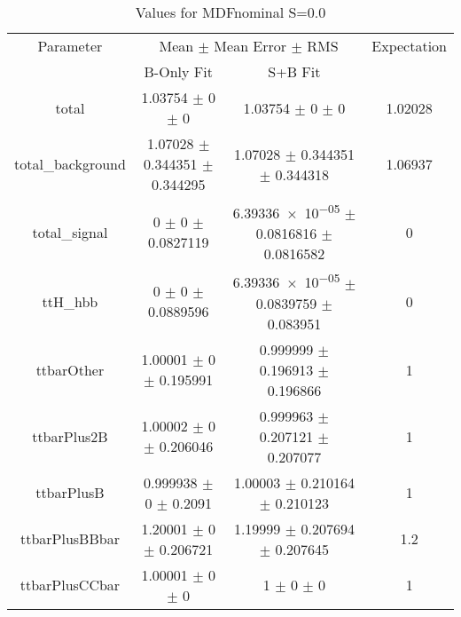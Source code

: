 \begin{table}
\centering
\caption{Values for MDFnominal S=0.0}
\begin{tabular}{cccc}
\toprule
Parameter & \multicolumn{2}{c}{Mean $\pm$ Mean Error $\pm$ RMS} & Expectation\\
 & B-Only Fit & S+B Fit & \\
\midrule
total & \num{1.03754} $\pm$ \num{0} $\pm$ \num{0} & \num{1.03754} $\pm$ \num{0} $\pm$ \num{0} & \num{1.02028}\\
total\_background & \num{1.07028} $\pm$ \num{0.344351} $\pm$ \num{0.344295} & \num{1.07028} $\pm$ \num{0.344351} $\pm$ \num{0.344318} & \num{1.06937}\\
total\_signal & \num{0} $\pm$ \num{0} $\pm$ \num{0.0827119} & \num{6.39336e-05} $\pm$ \num{0.0816816} $\pm$ \num{0.0816582} & \num{0}\\
ttH\_hbb & \num{0} $\pm$ \num{0} $\pm$ \num{0.0889596} & \num{6.39336e-05} $\pm$ \num{0.0839759} $\pm$ \num{0.083951} & \num{0}\\
ttbarOther & \num{1.00001} $\pm$ \num{0} $\pm$ \num{0.195991} & \num{0.999999} $\pm$ \num{0.196913} $\pm$ \num{0.196866} & \num{1}\\
ttbarPlus2B & \num{1.00002} $\pm$ \num{0} $\pm$ \num{0.206046} & \num{0.999963} $\pm$ \num{0.207121} $\pm$ \num{0.207077} & \num{1}\\
ttbarPlusB & \num{0.999938} $\pm$ \num{0} $\pm$ \num{0.2091} & \num{1.00003} $\pm$ \num{0.210164} $\pm$ \num{0.210123} & \num{1}\\
ttbarPlusBBbar & \num{1.20001} $\pm$ \num{0} $\pm$ \num{0.206721} & \num{1.19999} $\pm$ \num{0.207694} $\pm$ \num{0.207645} & \num{1.2}\\
ttbarPlusCCbar & \num{1.00001} $\pm$ \num{0} $\pm$ \num{0} & \num{1} $\pm$ \num{0} $\pm$ \num{0} & \num{1}\\
\bottomrule
\end{tabular}
\end{table}